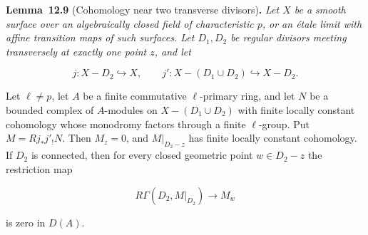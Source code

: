 \documentclass[11pt]{article}
\newenvironment{bpstatement}[2]{\par\addvspace{0.6\baselineskip}\noindent\textbf{#1}#2\textbf{.}\enspace\ignorespaces}
  {\par\addvspace{0.4\baselineskip}}
\newenvironment{bpstatementit}[2]{\begin{bpstatement}{#1}{#2}\itshape\ignorespaces}{\end{bpstatement}}
\begin{document}
\label{bp28}%
\begin{bpstatementit}{Lemma~12.9}{ (Cohomology near two transverse divisors)}
Let \(X\) be a smooth surface over an algebraically closed field of characteristic \(p\), or an étale limit with affine transition maps of such surfaces. Let \(D_1,D_2\) be regular divisors meeting transversely at exactly one point \(z\), and let

\[
j:X-D_2\hookrightarrow X,\qquad
j':X-(D_1\cup D_2)\hookrightarrow X-D_2.
\]

Let \(\ell\ne p\), let \(A\) be a finite commutative \(\ell\)-primary ring, and let \(N\) be a bounded complex of \(A\)-modules on \(X-(D_1\cup D_2)\) with finite locally constant cohomology whose monodromy factors through a finite \(\ell\)-group. Put \(M=Rj_*j'_!N\). Then \(M_z=0\), and \(M|_{D_2-z}\) has finite locally constant cohomology. If \(D_2\) is connected, then for every closed geometric point \(w\in D_2-z\) the restriction map

\[
R\Gamma(D_2,M|_{D_2})\longrightarrow M_w
\]

is zero in \(D(A)\).
\end{bpstatementit}
\end{document}

